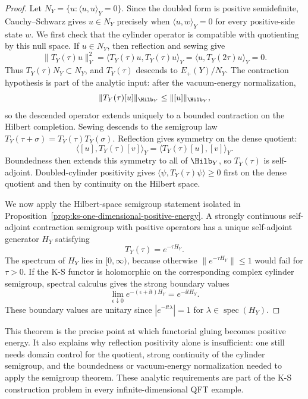 \begin{proof}
Let \(N_Y=\{u:\langle u,u\rangle_Y=0\}\).  Since the doubled form is positive
semidefinite, Cauchy--Schwarz gives \(u\in N_Y\) precisely when
\(\langle u,w\rangle_Y=0\) for every positive-side state \(w\).  We first
check that the cylinder operator is compatible with quotienting by this null
space.  If \(u\in N_Y\), then reflection and sewing give
\[
  \|T_Y(\tau)u\|_Y^2
  =
  \langle T_Y(\tau)u,T_Y(\tau)u\rangle_Y
  =
  \langle u,T_Y(2\tau)u\rangle_Y
  =
  0 .
\]
Thus \(T_Y(\tau)N_Y\subset N_Y\), and \(T_Y(\tau)\) descends to
\(E_+(Y)/N_Y\).  The contraction hypothesis is part of the analytic input:
after the vacuum-energy normalization,
\[
  \|T_Y(\tau)[u]\|_{\Hilb_Y}\leq \|[u]\|_{\Hilb_Y},
\]
so the descended operator extends uniquely to a bounded contraction on the
Hilbert completion.  Sewing descends to the semigroup law
\(T_Y(\tau+\sigma)=T_Y(\tau)T_Y(\sigma)\).  Reflection gives symmetry on the
dense quotient:
\[
  \langle [u],T_Y(\tau)[v]\rangle_Y
  =
  \langle T_Y(\tau)[u],[v]\rangle_Y .
\]
Boundedness then extends this symmetry to all of \(\Hilb_Y\), so
\(T_Y(\tau)\) is self-adjoint.  Doubled-cylinder positivity gives
\(\langle\psi,T_Y(\tau)\psi\rangle\ge0\) first on the dense quotient and then
by continuity on the Hilbert space.

We now apply the Hilbert-space semigroup statement isolated in
Proposition~\ref{prop:ks-one-dimensional-positive-energy}.  A strongly
continuous self-adjoint contraction semigroup with positive operators has a
unique self-adjoint generator \(H_Y\) satisfying
\[
  T_Y(\tau)=e^{-\tau H_Y}.
\]
The spectrum of \(H_Y\) lies in \([0,\infty)\), because otherwise
\(\|e^{-\tau H_Y}\|\leq1\) would fail for \(\tau>0\).  If the K-S functor is
holomorphic on the corresponding complex cylinder semigroup, spectral calculus
gives the strong boundary values
\[
  \lim_{\epsilon\downarrow0}e^{-(\epsilon+\ii t)H_Y}
  =
  e^{-\ii tH_Y}.
\]
These boundary values are unitary since \(|e^{-\ii t\lambda}|=1\) for
\(\lambda\in\operatorname{spec}(H_Y)\).
\end{proof}

This theorem is the precise point at which functorial gluing becomes positive
energy.  It also explains why reflection positivity alone is insufficient:
one still needs domain control for the quotient, strong continuity of the
cylinder semigroup, and the boundedness or vacuum-energy normalization needed
to apply the semigroup theorem.  These analytic requirements are part of the
K-S construction problem in every infinite-dimensional QFT example.

